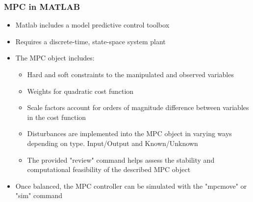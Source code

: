 \documentclass[aspectratio=169]{beamer}
\begin{document}
    

\begin{frame}[t]
    \frametitle{MPC in MATLAB}
    \begin{itemize}
        \item Matlab includes a model predictive control toolbox
        \item Requires a discrete-time, state-space system plant
        \item The MPC object includes:
        \begin{itemize}
            \item Hard and soft constraints to the manipulated and observed variables
            \item Weights for quadratic cost function
            \item Scale factors account for orders of magnitude difference between variables in the cost function
            \item Disturbances are implemented into the MPC object in varying ways depending on type. Input/Output and Known/Unknown
            \item The provided "review" command helps assess the stability and computational feasibility of the described MPC object
        \end{itemize}
        \item Once balanced, the MPC controller can be simulated with the "mpcmove" or "sim" command
    \end{itemize}
\end{frame}
\end{document}
